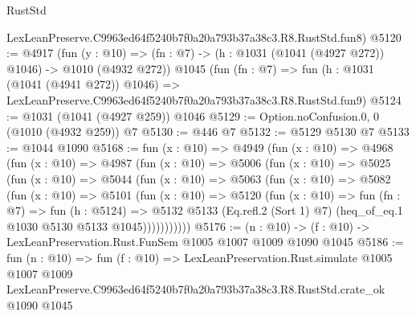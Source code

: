 \begin{lexlean}{RustStd}
\begin{coremodule}
    LexLeanPreserve.C9963ed64f5240b7f0a20a793b37a38c3.R8.RustStd.fun8)
@5120 := @4917
    (fun (y : @10) => (fn : @7) -> (h : @1031 (@1041 (@4927 @272)) @1046) -> @1010 (@4932 @272))
    @1045
    (fun (fn : @7) =>
    fun (h : @1031 (@1041 (@4941 @272)) @1046) =>
    LexLeanPreserve.C9963ed64f5240b7f0a20a793b37a38c3.R8.RustStd.fun9)
@5124 := @1031 (@1041 (@4927 @259)) @1046
@5129 := Option.noConfusion.{0, 0} (@1010 (@4932 @259)) @7
@5130 := @446 @7
@5132 := @5129 @5130 @7
@5133 := @1044 @1090
@5168 := fun (x : @10) =>
  @4949
    (fun (x : @10) =>
    @4968
      (fun (x : @10) =>
      @4987
        (fun (x : @10) =>
        @5006
          (fun (x : @10) =>
          @5025
            (fun (x : @10) =>
            @5044
              (fun (x : @10) =>
              @5063
                (fun (x : @10) =>
                @5082
                  (fun (x : @10) =>
                  @5101
                    (fun (x : @10) =>
                    @5120
                      (fun (x : @10) =>
                      fun (fn : @7) =>
                      fun (h : @5124) =>
                      @5132
                        @5133
                        (Eq.refl.{2} (Sort 1) @7)
                        (heq_of_eq.{1} @1030 @5130 @5133 @1045)))))))))))
@5176 := (n : @10) -> (f : @10) -> LexLeanPreservation.Rust.FunSem @1005 @1007 @1009 @1090 @1045
@5186 := fun (n : @10) =>
  fun (f : @10) =>
  LexLeanPreservation.Rust.simulate
    @1005
    @1007
    @1009
    LexLeanPreserve.C9963ed64f5240b7f0a20a793b37a38c3.R8.RustStd.crate_ok
    @1090
    @1045
\end{coremodule}
\end{lexlean}
